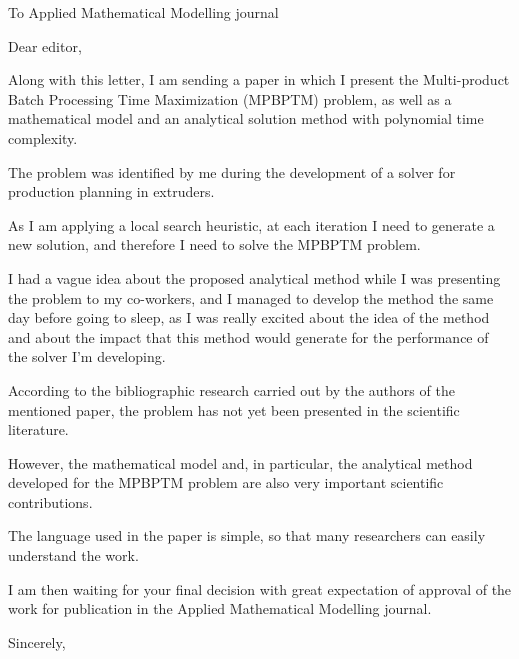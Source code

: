 \documentclass[
  fontsize=11pt,
  paper=a4,
  parskip=half,
  enlargefirstpage=on,    %
  fromalign=right,        %
  fromphone=off,          %
  fromrule=aftername,     %
  addrfield=on,           %
  backaddress=on,         %
  subject=beforeopening,  %
  locfield=narrow,        %
  foldmarks=on,           %
]{scrlttr2}
\begin{document}
\begin{letter}{To Applied Mathematical Modelling journal}
    \opening{Dear editor,}

	Along with this letter, I am sending a paper in which I present the Multi-product Batch Processing Time Maximization (MPBPTM) problem, as well as a mathematical model and an analytical solution method with polynomial time complexity.

The problem was identified by me during the development of a solver for production planning in extruders.

As I am applying a local search heuristic, at each iteration I need to generate a new solution, and therefore I need to solve the MPBPTM problem.

I had a vague idea about the proposed analytical method while I was presenting the problem to my co-workers, and I managed to develop the method the same day before going to sleep, as I was really excited about the idea of the method and about the impact that this method would generate for the performance of the solver I'm developing.

According to the bibliographic research carried out by the authors of the mentioned paper, the problem has not yet been presented in the scientific literature.

However, the mathematical model and, in particular, the analytical method developed for the MPBPTM problem are also very important scientific contributions.

The language used in the paper is simple, so that many researchers can easily understand the work.

I am then waiting for your final decision with great expectation of approval of the work for publication in the Applied Mathematical Modelling journal.	
    \closing{Sincerely,}
  \end{letter}
\end{document}
